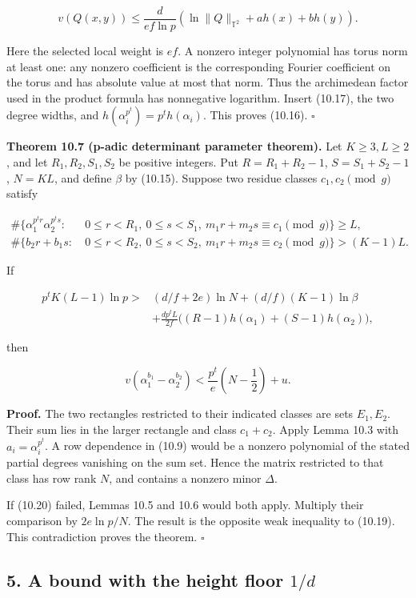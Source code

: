 \documentclass[
  11pt,
  a4paper,
]{article}
\begin{document}
\[
v(Q(x,y))\le\frac d{ef\ln p}
\left(\ln\|Q\|_{\mathbb T^2}+a h(x)+b h(y)\right).
\]

Here the selected local weight is \(ef\). A nonzero integer polynomial
has torus norm at least one: any nonzero coefficient is the
corresponding Fourier coefficient on the torus and has absolute value at
most that norm. Thus the archimedean factor used in the product formula
has nonnegative logarithm. Insert (10.17), the two degree widths, and
\(h(\alpha_i^{p^t})=p^t h(\alpha_i)\). This proves (10.16). \(\square\)

\textbf{Theorem 10.7 (p-adic determinant parameter theorem).} Let
\(K\ge3,L\ge2\), and let \(R_1,R_2,S_1,S_2\) be positive integers. Put
\(R=R_1+R_2-1\), \(S=S_1+S_2-1\), \(N=KL\), and define \(\beta\) by
(10.15). Suppose two residue classes \(c_1,c_2\pmod g\) satisfy

\[
\begin{aligned}
\#\{\alpha_1^{p^tr}\alpha_2^{p^ts}:&\ 0\le r<R_1,\ 0\le s<S_1,
\ m_1r+m_2s\equiv c_1\pmod g\}\ge L,\\
\#\{b_2r+b_1s:&\ 0\le r<R_2,\ 0\le s<S_2,
\ m_1r+m_2s\equiv c_2\pmod g\}>(K-1)L.
\end{aligned}
\tag{10.18}
\]

If

\[
\begin{aligned}
p^tK(L-1)\ln p>{}&(d/f+2e)\ln N+(d/f)(K-1)\ln\beta\\
&+\frac{d p^tL}{2f}\bigl((R-1)h(\alpha_1)+(S-1)h(\alpha_2)\bigr),
\end{aligned}
\tag{10.19}
\]

then

\[
v(\alpha_1^{b_1}-\alpha_2^{b_2})
<\frac{p^t}e\left(N-\frac12\right)+u.
\tag{10.20}
\]

\textbf{Proof.} The two rectangles restricted to their indicated classes
are sets \(E_1,E_2\). Their sum lies in the larger rectangle and class
\(c_1+c_2\). Apply Lemma 10.3 with \(a_i=\alpha_i^{p^t}\). A row
dependence in (10.9) would be a nonzero polynomial of the stated partial
degrees vanishing on the sum set. Hence the matrix restricted to that
class has row rank \(N\), and contains a nonzero minor \(\Delta\).

If (10.20) failed, Lemmas 10.5 and 10.6 would both apply. Multiply their
comparison by \(2e\ln p/N\). The result is the opposite weak inequality
to (10.19). This contradiction proves the theorem. \(\square\)

\subsection{\texorpdfstring{5. A bound with the height floor
\(1/d\)}{5. A bound with the height floor 1/d}}\label{a-bound-with-the-height-floor-1d}
\end{document}
